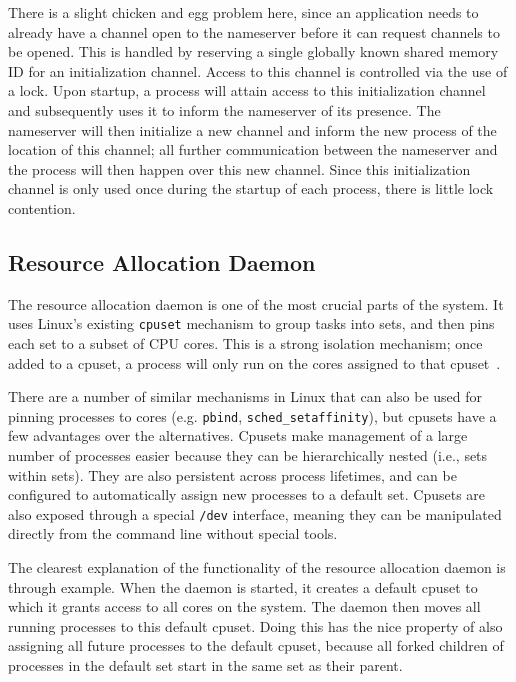 \documentclass[letterpaper,twocolumn,11pt]{article}
\begin{document}
There is a slight chicken and egg problem here, since an application needs to already have a channel open to the nameserver before it can request channels to be opened. This is handled by reserving a single globally known shared memory ID for an initialization channel. Access to this channel is controlled via the use of a lock. Upon startup, a process will attain access to this initialization channel and subsequently uses it to inform the nameserver of its presence. The nameserver will then initialize a new channel and inform the new process of the location of this channel; all further communication between the nameserver and the process will then happen over this new channel. Since this initialization channel is only used once during the startup of each process, there is little lock contention.

\subsection{Resource Allocation Daemon}

The resource allocation daemon is one of the most crucial parts of the system. It uses Linux's existing {\tt cpuset} mechanism to group tasks into sets, and then pins each set to a subset of CPU cores. This is a strong isolation mechanism; once added to a cpuset, a process will only run on the cores assigned to that cpuset~\cite{cpusets}.

There are a number of similar mechanisms in Linux that can also be used for pinning processes to cores (e.g. {\tt pbind}, {\tt sched\_setaffinity}), but cpusets have a few advantages over the alternatives. Cpusets make management of a large number of processes easier because they can be hierarchically nested (i.e., sets within sets). They are also persistent across process lifetimes, and can be configured to automatically assign new processes to a default set. Cpusets are also exposed through a special {\tt /dev} interface, meaning they can be manipulated directly from the command line without special tools.

The clearest explanation of the functionality of the resource allocation daemon is through example. When the daemon is started, it creates a default cpuset to which it grants access to all cores on the system. The daemon then moves all running processes to this default cpuset. Doing this has the nice property of also assigning all future processes to the default cpuset, because all forked children of processes in the default set start in the same set as their parent.
\end{document}
